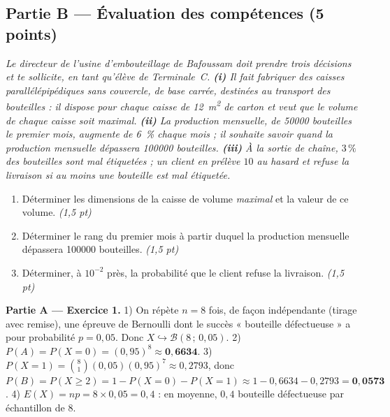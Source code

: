 \subsection*{Partie B — Évaluation des compétences \hfill (5 points)}

\noindent\textit{Le directeur de l'usine d'embouteillage de Bafoussam doit prendre trois
décisions et te sollicite, en tant qu'élève de Terminale~C. \textbf{(i)} Il fait fabriquer
des caisses parallélépipédiques sans couvercle, de base carrée, destinées au transport
des bouteilles : il dispose pour chaque caisse de \SI{12}{\metre\squared} de carton et
veut que le volume de chaque caisse soit \emph{maximal}. \textbf{(ii)} La production
mensuelle, de \num{50000} bouteilles le premier mois, augmente de \SI{6}{\percent} chaque
mois ; il souhaite savoir quand la production mensuelle dépassera \num{100000} bouteilles.
\textbf{(iii)} À la sortie de chaîne, $3\,\%$ des bouteilles sont mal étiquetées ; un
client en prélève $10$ au hasard et refuse la livraison si au moins une bouteille est mal
étiquetée.}

\begin{enumerate}[label=\textbf{Tâche \arabic*.},leftmargin=2.4em]
\item Déterminer les dimensions de la caisse de volume \emph{maximal} et la valeur de ce
volume. \hfill\textit{(1,5 pt)}
\item Déterminer le rang du premier mois à partir duquel la production mensuelle dépassera
\num{100000} bouteilles. \hfill\textit{(1,5 pt)}
\item Déterminer, à $10^{-2}$ près, la probabilité que le client refuse la livraison. \hfill\textit{(1,5 pt)}
\end{enumerate}
\par{}


\noindent\textbf{Partie A — Exercice 1.}
1) On répète $n=8$ fois, de façon indépendante (tirage avec remise), une épreuve de
Bernoulli dont le succès « bouteille défectueuse » a pour probabilité $p=0{,}05$. Donc
$X\hookrightarrow\mathcal{B}(8\,;\,0{,}05)$.
2) $P(A)=P(X{=}0)=(0{,}95)^8\approx\mathbf{0{,}6634}$.
3) $P(X{=}1)=\binom{8}{1}(0{,}05)(0{,}95)^7\approx0{,}2793$, donc
$P(B)=P(X\ge2)=1-P(X{=}0)-P(X{=}1)\approx1-0{,}6634-0{,}2793=\mathbf{0{,}0573}$.
4) $E(X)=np=8\times0{,}05=0{,}4$ : en moyenne, $0{,}4$ bouteille défectueuse par
échantillon de $8$.

